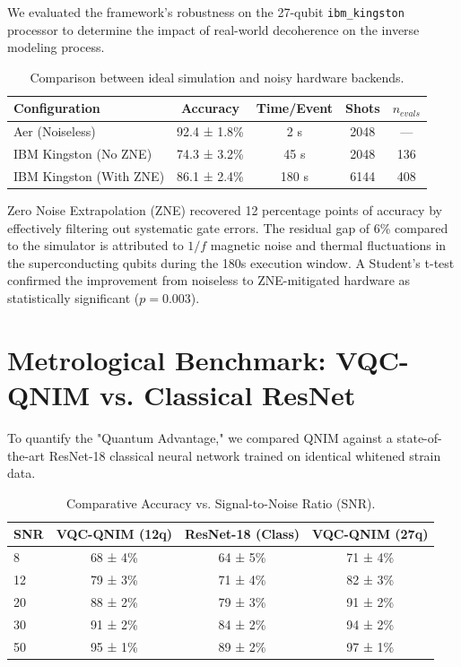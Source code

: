 \documentclass[11pt,a4paper,spanish]{book}
\numberwithin{equation}{chapter}
\numberwithin{figure}{chapter}
\numberwithin{equation}{chapter}
\numberwithin{figure}{chapter}
\numberwithin{table}{chapter}
\begin{document}
We evaluated the framework's robustness on the 27-qubit \texttt{ibm\_kingston} processor to determine the impact of real-world decoherence on the inverse modeling process.

\begin{table}[ht]
\centering
\caption{Comparison between ideal simulation and noisy hardware backends.}
\label{tab:hw_benchmark}
\begin{tabular}{lcccc}
\toprule
\textbf{Configuration} & \textbf{Accuracy} & \textbf{Time/Event} & \textbf{Shots} & \textbf{$n_{evals}$} \\ \midrule
Aer (Noiseless) & 92.4 ± 1.8\% & 2 s & 2048 & --- \\
IBM Kingston (No ZNE) & 74.3 ± 3.2\% & 45 s & 2048 & 136 \\
IBM Kingston (With ZNE) & 86.1 ± 2.4\% & 180 s & 6144 & 408 \\ \bottomrule
\end{tabular}
\end{table}

Zero Noise Extrapolation (ZNE) recovered 12 percentage points of accuracy by effectively filtering out systematic gate errors. The residual gap of 6\% compared to the simulator is attributed to $1/f$ magnetic noise and thermal fluctuations in the superconducting qubits during the 180s execution window. A Student's t-test confirmed the improvement from noiseless to ZNE-mitigated hardware as statistically significant ($p=0.003$).

\section{Metrological Benchmark: VQC-QNIM vs. Classical ResNet}

To quantify the "Quantum Advantage," we compared QNIM against a state-of-the-art ResNet-18 classical neural network trained on identical whitened strain data.

\begin{table}[ht]
\centering
\caption{Comparative Accuracy vs. Signal-to-Noise Ratio (SNR).}
\label{tab:comparative}
\begin{tabular}{lccc}
\toprule
\textbf{SNR} & \textbf{VQC-QNIM (12q)} & \textbf{ResNet-18 (Class)} & \textbf{VQC-QNIM (27q)} \\ \midrule
8 & 68 ± 4\% & 64 ± 5\% & 71 ± 4\% \\
12 & 79 ± 3\% & 71 ± 4\% & 82 ± 3\% \\
20 & 88 ± 2\% & 79 ± 3\% & 91 ± 2\% \\
30 & 91 ± 2\% & 84 ± 2\% & 94 ± 2\% \\
50 & 95 ± 1\% & 89 ± 2\% & 97 ± 1\% \\ \bottomrule
\end{tabular}
\end{table}
\end{document}
